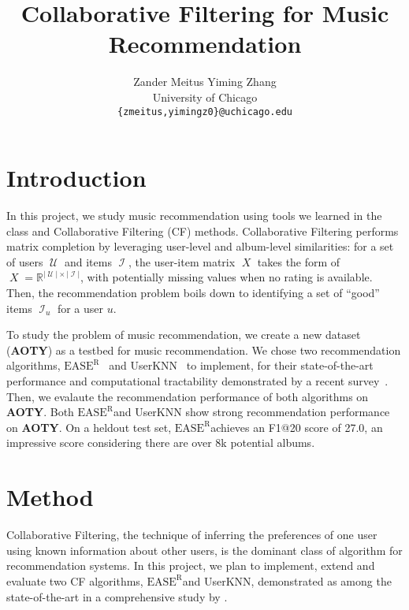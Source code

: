 \documentclass{article}
\title{Collaborative Filtering for Music Recommendation}
\author{
  Zander Meitus \qquad Yiming Zhang \\
  University of Chicago \\
  \texttt{\{zmeitus,yimingz0\}@uchicago.edu}
}
\newcommand{\aoty}{{\bf AOTY}\xspace}
\DeclareMathOperator{\X}{\mathit{X}}
\DeclareMathOperator{\U}{\mathcal{U}}
\DeclareMathOperator{\I}{\mathcal{I}}
\newcommand{\card}[1]{\ensuremath{\lvert {#1} \rvert}}
\newcommand{\easer}{$\text{EASE}^\text{R}$}
\newcommand{\userknn}{UserKNN\xspace}
\begin{document}
\maketitle

\section{Introduction}

In this project, we study music recommendation using tools we learned
 in the class and Collaborative Filtering (CF) methods.
Collaborative Filtering performs matrix completion by leveraging
user-level and album-level similarities:
for a set of users $\U$ and items $\I$, the user-item matrix $\X$ takes the
form of $\X = \mathbb{R}^{\card{\U} \times \card{\I}}$, with potentially
missing values when no rating is available.
Then, the recommendation problem boils down to identifying a set of ``good''
items $\I_u$ for a user $u$.

To study the problem of music recommendation, we create a new dataset (\aoty) as
a testbed for music recommendation.
We chose two recommendation algorithms, \easer~\citep{steckEmbarrassinglyShallowAutoencoders2019}
and \userknn~\citep{resnickGroupLensOpenArchitecture1994} to implement, for their state-of-the-art
performance and computational tractability demonstrated by a recent survey~\citep{anelliTopNRecommendationAlgorithms2022}.
Then, we evalaute the recommendation performance of both algorithms on \aoty.
Both \easer and \userknn show strong recommendation performance on \aoty.
On a heldout test set, \easer achieves an F1@20 score of 27.0, an impressive score
considering there are over 8k potential albums.


\section{Method}
Collaborative Filtering, the technique of inferring the preferences of one
 user using known information about other users, is the dominant class of
 algorithm for recommendation systems.
In this project, we plan to implement, extend and evaluate two CF algorithms,
 \easer and \userknn, demonstrated as among the state-of-the-art in a
 comprehensive study by \citet{anelliTopNRecommendationAlgorithms2022}.
\end{document}
